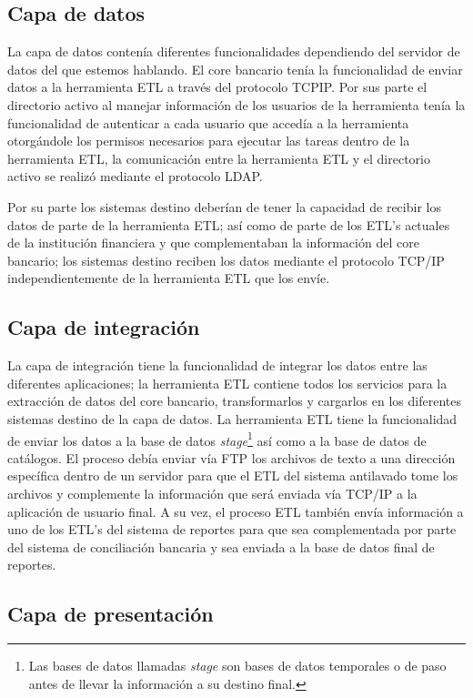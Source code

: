 \subsection{Capa de datos}

La capa de datos contenía diferentes funcionalidades dependiendo del servidor de
datos del que estemos hablando. El core bancario tenía la funcionalidad de
enviar datos a la herramienta ETL a través del protocolo TCP\/IP. Por sus parte
el directorio activo al manejar información de los usuarios de la herramienta
tenía la funcionalidad de autenticar a cada usuario que accedía a la herramienta
otorgándole los permisos necesarios para ejecutar las tareas dentro de la
herramienta ETL, la comunicación entre la herramienta ETL y el directorio activo
se realizó mediante el protocolo LDAP.

Por su parte los sistemas destino deberían de tener la capacidad de recibir los
datos de parte de la herramienta ETL; así como de parte de los ETL's actuales de
la institución financiera y que complementaban la información del core bancario;
los sistemas destino reciben los datos mediante el protocolo TCP/IP
independientemente de la herramienta ETL que los envíe.

\subsection{Capa de integración}

La capa de integración tiene la funcionalidad de integrar los datos entre las
diferentes aplicaciones; la herramienta ETL contiene todos los servicios para la
extracción de datos del core bancario, transformarlos y cargarlos en los
diferentes sistemas destino de la capa de datos. La herramienta ETL tiene la
funcionalidad de enviar los datos a la base de datos \emph{stage}\footnote{Las
  bases de datos llamadas \emph{stage} son bases de datos temporales o de paso
  antes de llevar la información a su destino final.} así como a la base de
datos de catálogos. El proceso debía enviar vía FTP los archivos de texto a una
dirección específica dentro de un servidor para que el ETL del sistema
antilavado tome los archivos y complemente la información que será enviada vía
TCP/IP a la aplicación de usuario final. A su vez, el proceso ETL también envía
información a uno de los ETL's del sistema de reportes para que sea
complementada por parte del sistema de conciliación bancaria y sea enviada a la
base de datos final de reportes.

\subsection{Capa de presentación}

